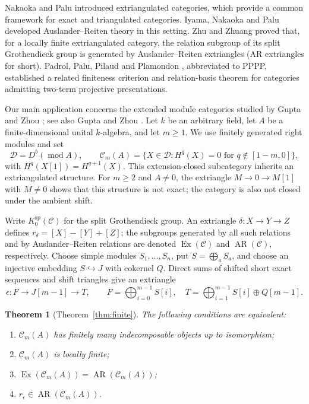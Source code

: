 \documentclass[pdflatex,sn-mathphys-num]{sn-jnl}
\numberwithin{equation}{section}
\newtheorem{theorem}{Theorem}[section]
\theoremstyle{definition}
\theoremstyle{remark}\newtheorem{remark}[theorem]{Remark}
\newcommand{\C}{\mathcal C}
\newcommand{\D}{\mathcal D}
\newcommand{\modu}{\operatorname{mod}}
\newcommand{\Ex}{\operatorname{Ex}}
\newcommand{\AR}{\operatorname{AR}}
\newcommand{\ksp}{K_0^{\mathrm{sp}}}
\begin{document}
Nakaoka and Palu \cite{NP} introduced extriangulated categories, which
provide a common framework for exact and triangulated categories.
Iyama, Nakaoka and Palu \cite{INP} developed Auslander--Reiten theory
in this setting. Zhu and Zhuang \cite{ZZ} proved that,
for a locally finite extriangulated category, the relation subgroup
of its split Grothendieck group is generated by Auslander--Reiten
extriangles (AR extriangles for short). Padrol, Palu, Pilaud and Plamondon
\cite{PPPP}, abbreviated to PPPP,
established a related finiteness criterion and relation-basis theorem
for categories admitting two-term projective presentations.

Our main application concerns the extended module categories studied by
Gupta \cite{Gupta} and Zhou \cite{Zhou}; see also Gupta and
Zhou \cite{GZ}. Let $k$ be an
arbitrary field, let $A$ be a finite-dimensional unital $k$-algebra, and
let $m\geq1$. We use finitely generated right modules and set
\[
 \D=D^b(\modu A),\qquad
 \C_m(A)=\{X\in\D:H^q(X)=0\text{ for }q\notin[1-m,0]\},
\]
with $H^q(X[1])=H^{q+1}(X)$. This extension-closed subcategory inherits
an extriangulated structure. For $m\geq2$ and $A\ne0$, the extriangle
$M\to0\to M[1]$ with $M\ne0$ shows that this structure is not exact;
the category is also not closed under the ambient shift.

Write $\ksp(\C)$ for the split Grothendieck group. An extriangle
$\delta:X\to Y\to Z$ defines $r_\delta=[X]-[Y]+[Z]$; the subgroups
generated by all such relations and by Auslander--Reiten relations are
denoted $\Ex(\C)$ and $\AR(\C)$, respectively. Choose simple modules
$S_1,\ldots,S_n$, put $S=\bigoplus_aS_a$, and choose an injective
embedding $S\hookrightarrow J$ with cokernel $Q$. Direct sums of
shifted short exact sequences and shift triangles give an extriangle
\begin{equation}\label{eq:introdetector}
 \epsilon:F\longrightarrow J[m-1]\longrightarrow T,\qquad
 F=\bigoplus_{i=0}^{m-1}S[i],\quad
 T=\bigoplus_{i=1}^{m-1}S[i]\oplus Q[m-1].
\end{equation}

\begin{theorem}[Theorem~\ref{thm:finite}]\label{intro:finite}
The following conditions are equivalent:
\begin{enumerate}
\item $\C_m(A)$ has finitely many indecomposable objects up to isomorphism;
\item $\C_m(A)$ is locally finite;
\item $\Ex(\C_m(A))=\AR(\C_m(A))$;
\item $r_\epsilon\in\AR(\C_m(A))$.
\end{enumerate}
\end{theorem}
\end{document}

